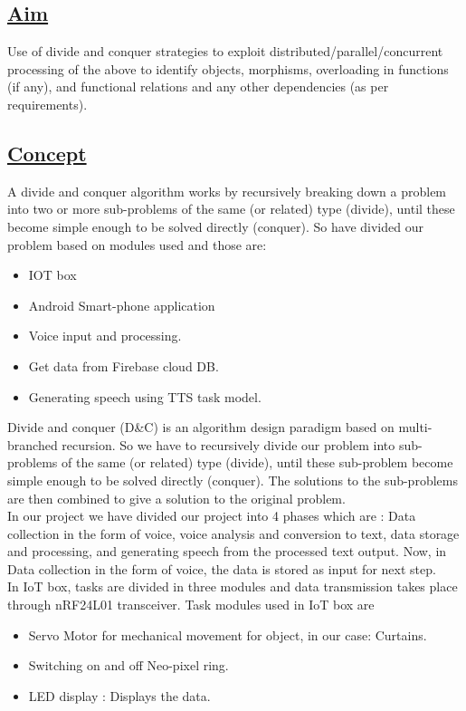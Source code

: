 \subsection*{\underline{Aim}}
\noindent
Use of divide and conquer strategies to exploit distributed/parallel/concurrent processing of the above to identify objects, morphisms, overloading in functions (if any), and functional relations and any other dependencies (as per requirements).
\subsection*{\underline{Concept}}
\hspace*{3em}A divide and conquer algorithm works by recursively breaking down a problem into two or more sub-problems of the same (or related) type (divide), until these become simple enough to be solved directly (conquer). So have divided our problem based on modules used and those are:
\begin{itemize}
\item IOT box
\item Android Smart-phone application
\item Voice input and processing.
\item Get data from Firebase cloud DB.
\item Generating speech using TTS task model.
\end{itemize}

\noindent
Divide and conquer (D\&C) is an algorithm design paradigm based on multi-branched recursion. So we have to recursively divide our problem into  sub-problems  of the same (or related) type (divide), until these sub-problem become simple enough to be solved directly (conquer). The solutions to the sub-problems are then combined to give a solution to the original problem.\\

\noindent
In our project we have divided our project into 4 phases which are : Data collection in the form of voice, voice analysis and conversion to text, data storage and processing, and generating speech from the processed text output. Now, in  Data collection in the form of voice, the data is stored as input for next step. \\

\noindent
In IoT box, tasks are divided in three modules and data transmission takes place through nRF24L01 transceiver. Task modules used in IoT box are 
\begin{itemize}
\item Servo Motor for mechanical movement for object, in our case: Curtains.
\item Switching on and off Neo-pixel ring.
\item LED display : Displays the data.
\end{itemize}

